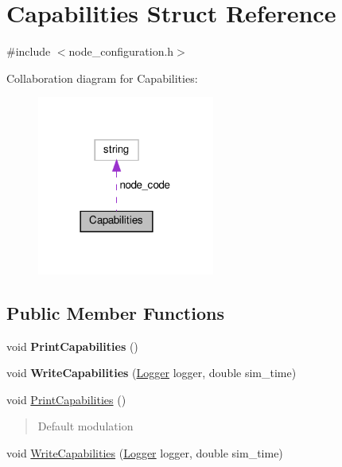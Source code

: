 \hypertarget{structCapabilities}{}\section{Capabilities Struct Reference}
\label{structCapabilities}


{\ttfamily \#include $<$node\+\_\+configuration.\+h$>$}



Collaboration diagram for Capabilities\+:\nopagebreak
\begin{figure}[H]
\begin{center}
\leavevmode
\includegraphics[width=165pt]{structCapabilities__coll__graph}
\end{center}
\end{figure}
\subsection*{Public Member Functions}
\begin{DoxyCompactItemize}
\item 
\mbox{\label{structCapabilities_a1a12dfd9ffe75c5bf62b2e5b526cb0d1}} 
void {\bfseries Print\+Capabilities} ()
\item 
\mbox{\label{structCapabilities_ab89f31c181ad2ec790b4c7f8dde21609}} 
void {\bfseries Write\+Capabilities} (\hyperlink{structLogger}{Logger} logger, double sim\+\_\+time)
\item 
void \hyperlink{structCapabilities_a1a12dfd9ffe75c5bf62b2e5b526cb0d1}{Print\+Capabilities} ()
\begin{DoxyCompactList}\small\item\em \begin{quote}
Default modulation \end{quote}
\end{DoxyCompactList}\item 
void \hyperlink{structCapabilities_ab89f31c181ad2ec790b4c7f8dde21609}{Write\+Capabilities} (\hyperlink{structLogger}{Logger} logger, double sim\+\_\+time)
\end{DoxyCompactItemize}
